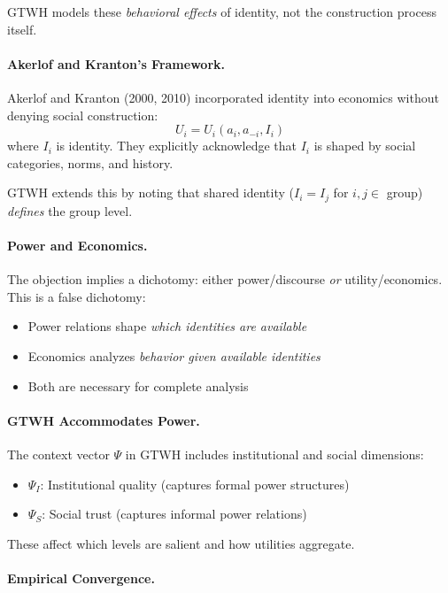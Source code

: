 \documentclass[12pt,a4paper]{article}
\begin{document}
GTWH models these \textit{behavioral effects} of identity, not the construction 
process itself.

\paragraph{Akerlof and Kranton's Framework.}

Akerlof and Kranton (2000, 2010) incorporated identity into economics without 
denying social construction:
\begin{equation}
U_i = U_i(a_i, a_{-i}, I_i)
\end{equation}
where $I_i$ is identity. They explicitly acknowledge that $I_i$ is shaped 
by social categories, norms, and history.

GTWH extends this by noting that shared identity ($I_i = I_j$ for $i, j \in$ group) 
\textit{defines} the group level.

\paragraph{Power and Economics.}

The objection implies a dichotomy: either power/discourse \textit{or} 
utility/economics. This is a false dichotomy:
\begin{itemize}[nosep]
\item Power relations shape \textit{which identities are available}
\item Economics analyzes \textit{behavior given available identities}
\item Both are necessary for complete analysis
\end{itemize}

\paragraph{GTWH Accommodates Power.}

The context vector $\Psi$ in GTWH includes institutional and social dimensions:
\begin{itemize}[nosep]
\item $\Psi_I$: Institutional quality (captures formal power structures)
\item $\Psi_S$: Social trust (captures informal power relations)
\end{itemize}

These affect which levels are salient and how utilities aggregate.

\paragraph{Empirical Convergence.}
\end{document}
